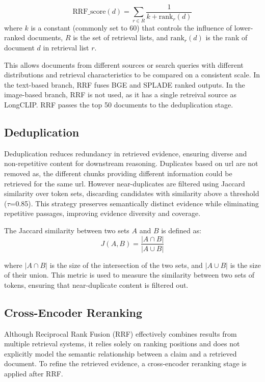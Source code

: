 \begin{equation}
    \text{RRF\_score}(d) = \sum_{r \in R} \frac{1}{k + \text{rank}_r(d)}
\end{equation}
where $k$ is a constant (commonly set to 60) that controls the influence of lower-ranked documents, $R$ is the set of retrieval lists, and $\text{rank}_r(d)$ is the rank of document $d$ in retrieval list $r$.

This allows documents from different sources or search queries with different distributions and retrieval characteristics to be compared on a consistent scale. In the text-based branch, RRF fuses BGE and SPLADE ranked outputs. In the image-based branch, RRF is not used, as it has a single retreival source as LongCLIP. RRF passes the top 50 documents to the deduplication stage.

\subsection{Deduplication}

Deduplication reduces redundancy in retrieved evidence, ensuring diverse and non-repetitive content for downstream reasoning. Duplicates based on url are not removed as, the different chunks providing different information could be retrieved for the same url. However near-duplicates are filtered using Jaccard similarity over token sets, discarding candidates with similarity above a threshold ($\tau$=0.85). This strategy preserves semantically distinct evidence while eliminating repetitive passages, improving evidence diversity and coverage.

The Jaccard similarity between two sets $A$ and $B$ is defined as:
\[
J(A, B) = \frac{|A \cap B|}{|A \cup B|}
\]

where $|A \cap B|$ is the size of the intersection of the two sets, and $|A \cup B|$ is the size of their union. This metric is used to measure the similarity between two sets of tokens, ensuring that near-duplicate content is filtered out.

\subsection{Cross-Encoder Reranking}

Although Reciprocal Rank Fusion (RRF) effectively combines results from multiple retrieval systems, it relies solely on ranking positions and does not explicitly model the semantic relationship between a claim and a retrieved document. To refine the retrieved evidence, a cross-encoder reranking stage is applied after RRF.

